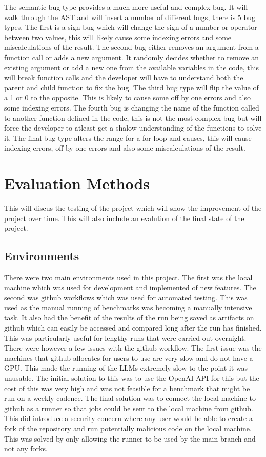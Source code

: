 \documentclass[12pt]{extarticle}
\begin{document}
The semantic bug type provides a much more useful and complex bug. It will walk through the AST and will insert a number of different bugs, there is 5 bug types. The first is a sign bug which will change the sign of a number or operator between two values, this will likely cause some indexing errors and some miscalculations of the result. The second bug either removes an argument from a function call or adds a new argument. It randomly decides whether to remove an existing argument or add a new one from the available variables in the code, this will break function calls and the developer will have to understand both the parent and child function to fix the bug. The third bug type will flip the value of a 1 or 0 to the opposite. This is likely to cause some off by one errors and also some indexing errors. The fourth bug is changing the name of the function called to another function defined in the code, this is not the most complex bug but will force the developer to atleast get a shalow understanding of the functions to solve it. The final bug type alters the range for a for loop and causes, this will cause indexing errors, off by one errors and also some miscalculations of the result.

\newpage
\section{Evaluation Methods}

This will discus the testing of the project which will show the improvement of the project over time. This will also include an evalution of the final state of the project.

\subsection{Environments}

There were two main environments used in this project. The first was the local machine which was used for development and implemented of new features. The second was github workflows which was used for automated testing. This was used as the manual running of benchmarks was becoming a manually intensive task. It also had the benefit of the results of the run being saved as artifacts on github which can easily be accessed and compared long after the run has finished. This was particularly useful for lengthy runs that were carried out overnight.
There were however a few issues with the github workflow. The first issue was the machines that github allocates for users to use are very slow and do not have a GPU. This made the running of the LLMs extremely slow to the point it was unusable. The initial solution to this was to use the OpenAI API for this but the cost of this was very high and was not feasible for a benchmark that might be run on a weekly cadence. The final solution was to connect the local machine to github as a runner so that jobs could be sent to the local machine from github. This did introduce a security concern where any user would be able to create a fork of the repository and run potentially malicious code on the local machine. This was solved by only allowing the runner to be used by the main branch and not any forks.
\end{document}
